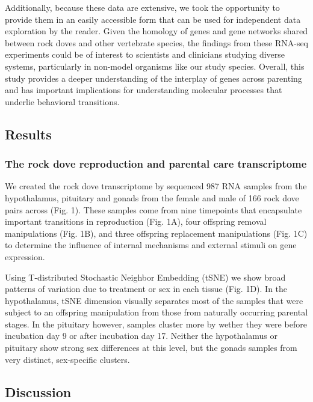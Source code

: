 Additionally, because these data are extensive, we took the opportunity
to provide them in an easily accessible form that can be used for
independent data exploration by the reader. Given the homology of genes
and gene networks shared between rock doves and other vertebrate
species, the findings from these RNA-seq experiments could be of
interest to scientists and clinicians studying diverse systems,
particularly in non-model organisms like our study species. Overall,
this study provides a deeper understanding of the interplay of genes
across parenting and has important implications for understanding
molecular processes that underlie behavioral transitions.

\hypertarget{results}{%
\subsection{Results}\label{results}}

\hypertarget{the-rock-dove-reproduction-and-parental-care-transcriptome}{%
\subsubsection{The rock dove reproduction and parental care
transcriptome}\label{the-rock-dove-reproduction-and-parental-care-transcriptome}}

We created the rock dove transcriptome by sequenced 987 RNA samples from
the hypothalamus, pituitary and gonads from the female and male of 166
rock dove pairs across (Fig. 1). These samples come from nine timepoints
that encapsulate important transitions in reproduction (Fig. 1A), four
offspring removal manipulations (Fig. 1B), and three offspring
replacement manipulations (Fig. 1C) to determine the influence of
internal mechanisms and external stimuli on gene expression.

Using T-distributed Stochastic Neighbor Embedding (tSNE) we show broad
patterns of variation due to treatment or sex in each tissue (Fig. 1D).
In the hypothalamus, tSNE dimension visually separates most of the
samples that were subject to an offspring manipulation from those from
naturally occurring parental stages. In the pituitary however, samples
cluster more by wether they were before incubation day 9 or after
incubation day 17. Neither the hypothalamus or pituitary show strong sex
differences at this level, but the gonads samples from very distinct,
sex-specific clusters.

\hypertarget{discussion}{%
\subsection{Discussion}\label{discussion}}

